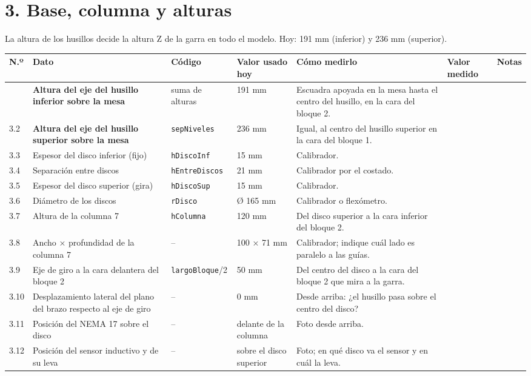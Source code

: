 \documentclass[10pt]{article}
\makeatletter
\newenvironment{medidas}{%
  \small
  \begin{longtable}{@{}L{0.9cm}L{5.0cm}L{2.3cm}L{2.7cm}L{6.4cm}>{\columncolor{fondo}}L{3.1cm}L{2.4cm}@{}}
  \toprule
  \textbf{N.º} & \textbf{Dato} & \textbf{Código} & \textbf{Valor usado hoy} & \textbf{Cómo medirlo} & \textbf{Valor medido} & \textbf{Notas}\\
  \midrule\endhead
  \bottomrule\endfoot}{\end{longtable}}
\newcommand{\cod}[1]{\texttt{\footnotesize #1}}
\makeatother
\begin{document}
\section{3. Base, columna y alturas}
La altura de los husillos decide la altura Z de la garra en todo el modelo. Hoy: 191 mm (inferior) y 236 mm (superior).
\begin{medidas}
3.1 & \textbf{Altura del eje del husillo inferior sobre la mesa} & suma de alturas & 191 mm & Escuadra apoyada en la mesa hasta el centro del husillo, en la cara del bloque 2. & & \\
3.2 & \textbf{Altura del eje del husillo superior sobre la mesa} & \cod{sepNiveles} & 236 mm & Igual, al centro del husillo superior en la cara del bloque 1. & & \\
3.3 & Espesor del disco inferior (fijo) & \cod{hDiscoInf} & 15 mm & Calibrador. & & \\
3.4 & Separación entre discos & \cod{hEntreDiscos} & 21 mm & Calibrador por el costado. & & \\
3.5 & Espesor del disco superior (gira) & \cod{hDiscoSup} & 15 mm & Calibrador. & & \\
3.6 & Diámetro de los discos & \cod{rDisco} & Ø 165 mm & Calibrador o flexómetro. & & \\
3.7 & Altura de la columna 7 & \cod{hColumna} & 120 mm & Del disco superior a la cara inferior del bloque 2. & & \\
3.8 & Ancho × profundidad de la columna 7 & -- & 100 × 71 mm & Calibrador; indique cuál lado es paralelo a las guías. & & \\
3.9 & Eje de giro a la cara delantera del bloque 2 & \cod{largoBloque}/2 & 50 mm & Del centro del disco a la cara del bloque 2 que mira a la garra. & & \\
3.10 & Desplazamiento lateral del plano del brazo respecto al eje de giro & -- & 0 mm & Desde arriba: ¿el husillo pasa sobre el centro del disco? & & \\
3.11 & Posición del NEMA 17 sobre el disco & -- & delante de la columna & Foto desde arriba. & & \\
3.12 & Posición del sensor inductivo y de su leva & -- & sobre el disco superior & Foto; en qué disco va el sensor y en cuál la leva. & & \\
\end{medidas}

\end{document}
